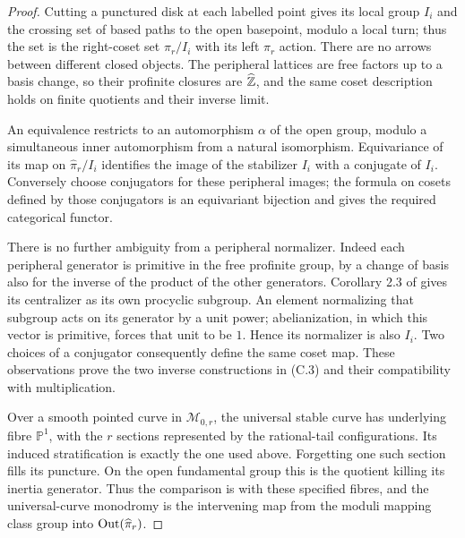 \begin{proof}
Cutting a punctured disk at each labelled point gives its local group $I_i$ and the crossing set of based paths to the open basepoint, modulo a local turn; thus the set is the right-coset set $\pi_r/I_i$ with its left $\pi_r$ action. There are no arrows between different closed objects. The peripheral lattices are free factors up to a basis change, so their profinite closures are $\widehat{\mathbb Z}$, and the same coset description holds on finite quotients and their inverse limit.

An equivalence restricts to an automorphism $\alpha$ of the open group, modulo a simultaneous inner automorphism from a natural isomorphism. Equivariance of its map on $\widehat\pi_r/I_i$ identifies the image of the stabilizer $I_i$ with a conjugate of $I_i$. Conversely choose conjugators for these peripheral images; the formula on cosets defined by those conjugators is an equivariant bijection and gives the required categorical functor.

There is no further ambiguity from a peripheral normalizer. Indeed each peripheral generator is primitive in the free profinite group, by a change of basis also for the inverse of the product of the other generators. Corollary 2.3 of \citet{BuxErshovRapinchuk2011} gives its centralizer as its own procyclic subgroup. An element normalizing that subgroup acts on its generator by a unit power; abelianization, in which this vector is primitive, forces that unit to be $1$. Hence its normalizer is also $I_i$. Two choices of a conjugator consequently define the same coset map. These observations prove the two inverse constructions in (C.3) and their compatibility with multiplication.

Over a smooth pointed curve in $\mathcal M_{0,r}$, the universal stable curve has underlying fibre $\mathbb P^1$, with the $r$ sections represented by the rational-tail configurations. Its induced stratification is exactly the one used above. Forgetting one such section fills its puncture. On the open fundamental group this is the quotient killing its inertia generator. Thus the comparison is with these specified fibres, and the universal-curve monodromy is the intervening map from the moduli mapping class group into $\operatorname{Out}(\widehat\pi_r)$.
\end{proof}


